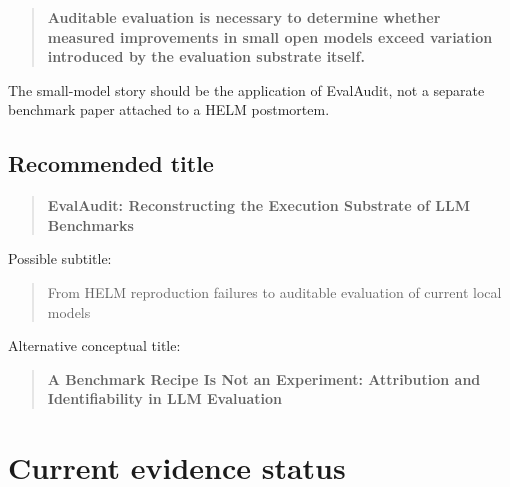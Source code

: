 \documentclass[11pt]{article}
\begin{document}
\begin{quote}
\textbf{Auditable evaluation is necessary to determine whether measured improvements in small open models exceed variation introduced by the evaluation substrate itself.}
\end{quote}

The small-model story should be the application of EvalAudit, not a separate benchmark paper attached to a HELM postmortem.

\subsection{Recommended title}

\begin{quote}
\textbf{EvalAudit: Reconstructing the Execution Substrate of LLM Benchmarks}
\end{quote}

Possible subtitle:

\begin{quote}
From HELM reproduction failures to auditable evaluation of current local models
\end{quote}

Alternative conceptual title:

\begin{quote}
\textbf{A Benchmark Recipe Is Not an Experiment: Attribution and Identifiability in LLM Evaluation}
\end{quote}

\section{Current evidence status}
\end{document}

